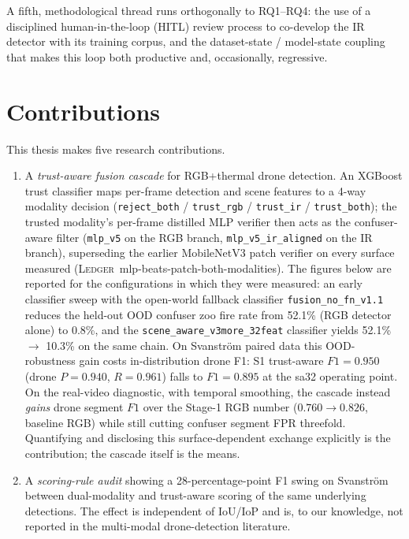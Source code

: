 \documentclass[12pt,a4paper,oneside,openright]{book}
\begin{document}
A fifth, methodological thread runs orthogonally to RQ1--RQ4: the use of a disciplined human-in-the-loop (HITL) review process to co-develop the IR detector with its training corpus, and the dataset-state / model-state coupling that makes this loop both productive and, occasionally, regressive.

\section{Contributions}

This thesis makes five research contributions.

\begin{enumerate}
    \item A \emph{trust-aware fusion cascade} for RGB+thermal drone detection. An XGBoost trust classifier maps per-frame detection and scene features to a 4-way modality decision (\texttt{reject\_both} / \texttt{trust\_rgb} / \texttt{trust\_ir} / \texttt{trust\_both}); the trusted modality's per-frame distilled MLP verifier then acts as the confuser-aware filter (\texttt{mlp\_v5} on the RGB branch, \texttt{mlp\_v5\_ir\_aligned} on the IR branch), superseding the earlier MobileNetV3 patch verifier on every surface measured (\textsc{Ledger}~mlp-beats-patch-both-modalities). The figures below are reported for the configurations in which they were measured: an early classifier sweep with the open-world fallback classifier \texttt{fusion\_no\_fn\_v1.1} reduces the held-out OOD confuser zoo fire rate from 52.1\% (RGB detector alone) to 0.8\%, and the \texttt{scene\_aware\_v3more\_32feat} classifier yields 52.1\% $\to$ 10.3\% on the same chain. On Svanstr\"om paired data this OOD-robustness gain costs in-distribution drone F1: S1 trust-aware $F1=0.950$ (drone $P=0.940$, $R=0.961$) falls to $F1=0.895$ at the sa32 operating point. On the real-video diagnostic, with temporal smoothing, the cascade instead \emph{gains} drone segment $F1$ over the Stage-1 RGB number ($0.760 \to 0.826$, baseline RGB) while still cutting confuser segment FPR threefold. Quantifying and disclosing this surface-dependent exchange explicitly is the contribution; the cascade itself is the means.
    \item A \emph{scoring-rule audit} showing a 28-percentage-point F1 swing on Svanstr\"om between dual-modality and trust-aware scoring of the same underlying detections. The effect is independent of IoU/IoP and is, to our knowledge, not reported in the multi-modal drone-detection literature.

\end{enumerate}
\end{document}
